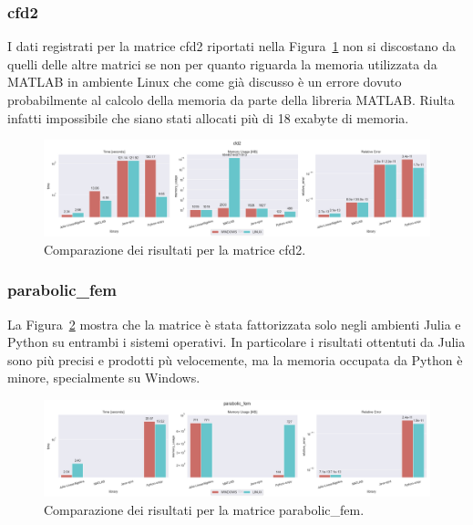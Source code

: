 \documentclass[a4paper, 12pt]{article}
\begin{document}
            \subsubsection{cfd2}
                I dati registrati per la matrice cfd2 riportati nella 
                Figura~\ref{fig:cfd2} non si discostano da quelli delle altre
                matrici se non per quanto riguarda la memoria utilizzata da
                MATLAB in ambiente Linux che come già discusso è un errore
                dovuto probabilmente al calcolo della memoria da parte della 
                libreria MATLAB. Riulta infatti impossibile che siano stati 
                allocati più di 18 exabyte di memoria.
                \begin{figure}[h]
                    \includegraphics[width=\textwidth]{cfd2}
                    \caption{Comparazione dei risultati per la matrice cfd2.}
                    \label{fig:cfd2}
                \end{figure}
            \subsubsection{parabolic\_fem}
                La Figura~\ref{fig:parabolic_fem} mostra che la matrice è stata
                fattorizzata solo negli ambienti Julia e Python su entrambi i 
                sistemi operativi. In particolare i risultati ottentuti da Julia
                sono più precisi e prodotti pù velocemente, ma la memoria 
                occupata da Python è minore, specialmente su Windows.
                \begin{figure}[h]
                    \includegraphics[width=\textwidth]{parabolic_fem}
                    \caption{Comparazione dei risultati per la matrice parabolic\_fem.}
                    \label{fig:parabolic_fem}
                \end{figure}
\end{document}
